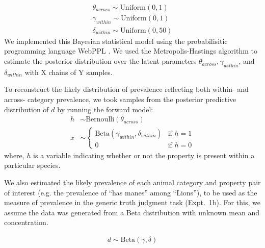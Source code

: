 \documentclass[10pt,letterpaper]{article}
\begin{document}
%
\begin{align*}
\theta_{across} \sim \text{Uniform} (0, 1) \\
\gamma_{within} \sim \text{Uniform}(0, 1) \\
\delta_{within} \sim \text{Uniform}(0, 50)
\end{align*}
%
We implemented this Bayesian statistical model using the probabilisitic programming language WebPPL \cite{dippl}. 
We used the Metropolis-Hastings algorithm to estimate the posterior distribution over the latent parameters $\theta_{across}, \gamma_{within}$, and $\delta_{within}$ with X chains of Y samples.

To reconstruct the likely distribution of  prevalence reflecting both within- and across- category prevalence, we took samples from the posterior predictive distribution of $d$ by running the forward model: 
%
\begin{align*}
h & \sim \text{Bernoulli}(\theta_{across}) \\
x & \sim \begin{cases} 
		\text{Beta}(\gamma_{within}, \delta_{within}) &\mbox{if } h = 1 \\ 
				0 & \mbox{if } h=0
				\end{cases} 
\end{align*}
%
where, $h$ is a variable indicating whether or not the property is present within a particular species. 

We also estimated the likely prevalence of each animal category and property pair of interest (e.g. the prevalence of ``has manes'' among ``Lions''), to be used as the measure of prevalence in the generic truth judgment task (Expt.~1b). 
For this, we assume the data was generated from a Beta distribution with unknown mean and concentration. 

\begin{align*}
d \sim \text{Beta}(\gamma, \delta) 
\end{align*}
\end{document}
